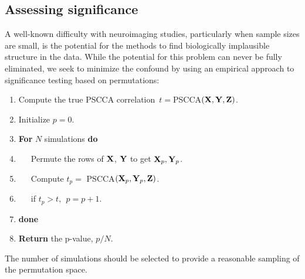 \documentclass{llncs}
\newcommand{\X}{{\bf X}}
\newcommand{\x}{{\bf x}}
\newcommand{\Y}{{\bf Y}}
\newcommand{\y}{{\bf y}}
\newcommand{\Z}{{\bf Z}}
\begin{document}
 
\subsection{Assessing significance}
A well-known difficulty with neuroimaging studies, particularly when
sample sizes are small, is the potential for the methods to find biologically implausible structure in the data.  While the
potential for this problem can never be fully eliminated, we seek to
minimize the confound by using an empirical approach to significance
testing based on permutations:
\begin{enumerate}
\item Compute the true PSCCA correlation~$t=$PSCCA$(\X,\Y,\Z)$.  
\item Initialize $p=0$. 
\item {\bf For} $N$ simulations {\bf do }
\item ~~~Permute the rows of $\X$, $\Y$ to get $\X_p, \Y_p$.
\item ~~~Compute $t_p=$ PSCCA$(\X_p,\Y_p,\Z)$.
\item ~~~if $t_p > t , ~~p=p+1$.
\item {\bf done }
\item {\bf Return} the p-value, $p/N$. 
\end{enumerate}
The number of simulations should be selected to provide a reasonable
sampling of the permutation space.  
\end{document}

